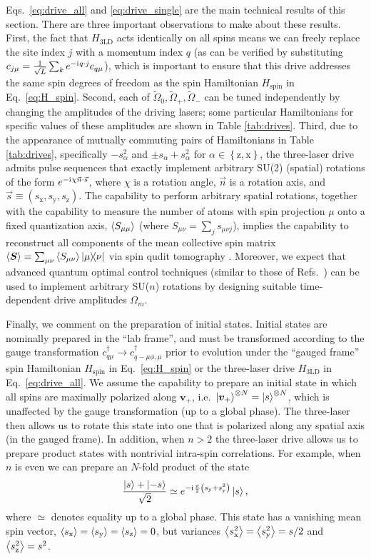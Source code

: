 \documentclass[nofootinbib,twocolumn]{revtex4-2}
\renewcommand{\t}{\text} %
\newcommand{\p}[1]{\left(#1\right)} %
\renewcommand{\set}[1]{\left\{#1\right\}} %
\newcommand{\bk}{\Braket} %
\renewcommand{\v}{\bm} %
\renewcommand{\c}{\cdot} %
\renewcommand{\i}{\mathrm{i}\mkern1mu} %
\newcommand{\1}{\mathds{1}}
\newcommand{\x}{\text{x}}
\newcommand{\y}{\text{y}}
\newcommand{\z}{\text{z}}
\begin{document}
Eqs.~\eqref{eq:drive_all} and \eqref{eq:drive_single} are the main technical results of this section.
There are three important observations to make about these results.
First, the fact that $H_{\t{3LD}}$ acts identically on all spins means we can freely replace the site index $j$ with a momentum index $q$ (as can be verified by substituting $c_{j\mu}=\frac1{\sqrt{L}}\sum_k e^{-\i q\c j} c_{q\mu}$), which is important to ensure that this drive addresses the same spin degrees of freedom as the spin Hamiltonian $H_{\t{spin}}$ in Eq.~\eqref{eq:H_spin}.
Second, each of $\tilde\Omega_0,\tilde\Omega_+,\tilde\Omega_-$ can be tuned independently by changing the amplitudes of the driving lasers; some particular Hamiltonians for specific values of these amplitudes are shown in Table \ref{tab:drives}.
Third, due to the appearance of mutually commuting pairs of Hamiltonians in Table \ref{tab:drives}, specifically $-s_\alpha^2$ and $\pm s_\alpha+s_\alpha^2$ for $\alpha\in\set{\z,\x}$, the three-laser drive admits pulse sequences that exactly implement arbitrary SU(2) (spatial) rotations of the form $e^{-\i\chi\vec n\c\vec s}$, where $\chi$ is a rotation angle, $\vec n$ is a rotation axis, and $\vec s\equiv(s_\x,s_\y,s_\z)$.
The capability to perform arbitrary spatial rotations, together with the capability to measure the number of atoms with spin projection $\mu$ onto a fixed quantization axis, $\bk{S_{\mu\mu}}$ (where $S_{\mu\nu}=\sum_js_{\mu\nu j}$), implies the capability to reconstruct all components of the mean collective spin matrix $\bk{\v S}=\sum_{\mu\nu}\bk{S_{\mu\nu}}\op{\mu}{\nu}$ via spin qudit tomography \cite{newton1968measurability, perlin2020qudit}.
Moreover, we expect that advanced quantum optimal control techniques (similar to those of Refs.~\cite{anderson2015accurate, lucarelli2018quantum}) can be used to implement arbitrary SU($n$) rotations by designing suitable time-dependent drive amplitudes $\Omega_m$.

Finally, we comment on the preparation of initial states.
Initial states are nominally prepared in the ``lab frame'', and must be transformed according to the gauge transformation $c_{q\mu}^\dag\to c_{q-\mu\phi,\mu}^\dag$ prior to evolution under the ``gauged frame'' spin Hamiltonian $H_{\t{spin}}$ in Eq.~\eqref{eq:H_spin} or the three-laser drive $H_{\t{3LD}}$ in Eq.~\eqref{eq:drive_all}.
We assume the capability to prepare an initial state in which all spins are maximally polarized along $\v v_+$, i.e.~$\ket{\v v_+}^{\otimes N}=\ket{s}^{\otimes N}$, which is unaffected by the gauge transformation (up to a global phase).
The three-laser then allows us to rotate this state into one that is polarized along any spatial axis (in the gauged frame).
In addition, when $n>2$ the three-laser drive allows us to prepare product states with nontrivial intra-spin correlations.
For example, when $n$ is even we can prepare an $N$-fold product of the state
\begin{align}
  \frac{\ket{s} + \ket{-s}}{\sqrt{2}}
  \simeq e^{-\i\frac{\pi}{2}\p{s_\y + s_\y^2}} \ket{s},
\end{align}
where $\simeq$ denotes equality up to a global phase.
This state has a vanishing mean spin vector, $\bk{s_\x}=\bk{s_\y}=\bk{s_\z}=0$, but variances $\bk{s_\x^2}=\bk{s_\y^2}=s/2$ and $\bk{s_\z^2}=s^2$.
\end{document}

